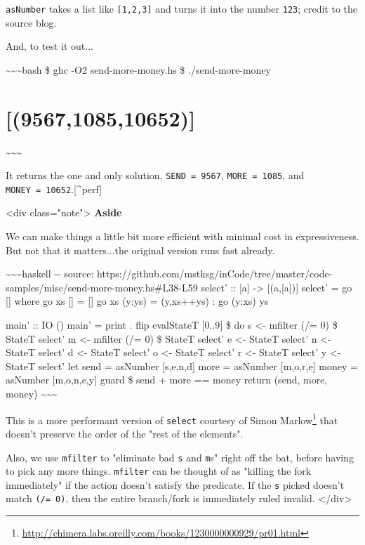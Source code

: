 \documentclass[]{article}
\renewcommand{\href}[2]{#2\footnote{\url{#1}}}
\begin{document}
\texttt{asNumber} takes a list like \texttt{{[}1,2,3{]}} and turns it into the
number \texttt{123}; credit to the source blog.

And, to test it out...

\textasciitilde{}\textasciitilde{}\textasciitilde{}bash \$ ghc -O2
send-more-money.hs \$ ./send-more-money

\section{{[}(9567,1085,10652){]}}

\textasciitilde{}\textasciitilde{}\textasciitilde{}

It returns the one and only solution, \texttt{SEND\ =\ 9567},
\texttt{MORE\ =\ 1085}, and \texttt{MONEY\ =\ 10652}.{[}\^{}perf{]}

\textless{}div class="note"\textgreater{} \textbf{Aside}

We can make things a little bit more efficient with minimal cost in
expressiveness. But not that it matters...the original version runs fast
already.

\textasciitilde{}\textasciitilde{}\textasciitilde{}haskell -\/- source:
https://github.com/mstksg/inCode/tree/master/code-samples/misc/send-more-money.hs\#L38-L59
select' :: {[}a{]} -\textgreater{} {[}(a,{[}a{]}){]} select' = go {[}{]} where
go xs {[}{]} = {[}{]} go xs (y:ys) = (y,xs++ys) : go (y:xs) ys

main' :: IO () main' = print . flip evalStateT {[}0..9{]} \$ do s \textless{}-
mfilter (/= 0) \$ StateT select' m \textless{}- mfilter (/= 0) \$ StateT select'
e \textless{}- StateT select' n \textless{}- StateT select' d \textless{}-
StateT select' o \textless{}- StateT select' r \textless{}- StateT select' y
\textless{}- StateT select' let send = asNumber {[}s,e,n,d{]} more = asNumber
{[}m,o,r,e{]} money = asNumber {[}m,o,n,e,y{]} guard \$ send + more == money
return (send, more, money) \textasciitilde{}\textasciitilde{}\textasciitilde{}

This is a more performant version of \texttt{select}
\href{http://chimera.labs.oreilly.com/books/1230000000929/pr01.html}{courtesy of
Simon Marlow} that doesn't preserve the order of the "rest of the elements".

Also, we use \texttt{mfilter} to "eliminate bad \texttt{s} and \texttt{m}s"
right off the bat, before having to pick any more things. \texttt{mfilter} can
be thought of as "killing the fork immediately" if the action doesn't satisfy
the predicate. If the \texttt{s} picked doesn't match \texttt{(/=\ 0)}, then the
entire branch/fork is immediately ruled invalid. \textless{}/div\textgreater{}
\end{document}
